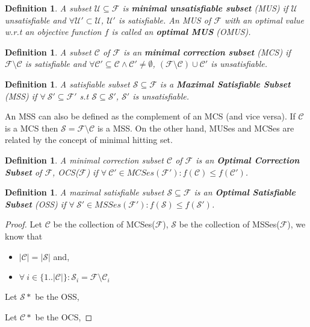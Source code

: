 \documentclass{article}
\newcommand\m[1]{\mathcal{#1}}
\newtheorem{definition}[thm]{Definition}
\begin{document}
\begin{definition}
  A subset $\m{U} \subseteq \m{F}$ is \textbf{minimal unsatisfiable subset} (MUS) if $\m{U}$ \emph{unsatisfiable} and $\forall \m{U}' \subset \m{U}$, $\m{U}'$ is \emph{satisfiable}. An MUS of $\m{F}$ with an optimal value w.r.t an \emph{objective function $f$} is called an \textbf{optimal MUS} (OMUS).
\end{definition}

\begin{definition}
  A subset $\m{C}$ of $\m{F}$ is an \textbf{minimal correction subset} (MCS) if $\m{F}  \setminus \m{C}$ is \emph{satisfiable} and $\forall \m{C}' \subseteq \m{C} \wedge \m{C}' \neq \emptyset$, $(\m{F} \setminus \m{C}) \cup \m{C}'$ is \emph{unsatisfiable}.
\end{definition}

\begin{definition}
  A \emph{satisfiable subset} $\m{S} \subseteq \m{F}$ is a \textbf{Maximal Satisfiable Subset} (MSS) if  $\forall \ \m{S}' \subseteq \m{F}'$ s.t $ \m{S} \subseteq \m{S}'$, $\m{S}'$ is \emph{unsatisfiable}.
\end{definition}

An MSS can also be defined as the complement of an MCS (and vice versa). If $\m{C}$ is a MCS then $ \m{S} = \m{F} \setminus \m{C}$ is a MSS. On the other hand, MUSes and MCSes are related by the concept of minimal hitting set.


\begin{definition}
  A \emph{minimal correction subset} $\m{C}$ of $\m{F}$ is an \textbf{Optimal Correction Subset} of $\m{F}$, OCS($\m{F}$) if $\forall \ \m{C}' \in MCSes(\m{F}'): f(\m{C}) \leq f(\m{C}')$.
\end{definition}


\begin{definition}
  A \emph{maximal satisfiable subset} $\m{S} \subseteq \m{F}$ is an \textbf{Optimal Satisfiable Subset} (OSS) if $\forall \ \m{S}' \in MSSes(\m{F}'): f(\m{S}) \leq f(\m{S}')$.
\end{definition}

\begin{proof}
  Let $\m{C}$ be the collection of MCSes($\m{F}$), $\m{S}$ be the collection of MSSes($\m{F}$), we know that 
  \begin{itemize}
    \item $|\m{C}| = |\m{S}|$ and,
    \item $\forall \ i \in \{1..|\m{C}|\}: \m{S}_i = \m{F} \setminus \m{C}_i$ 
  \end{itemize}


  Let $\m{S}*$ be the OSS, 

  Let $\m{C}*$ be the OCS, 
\end{proof}
\end{document}
